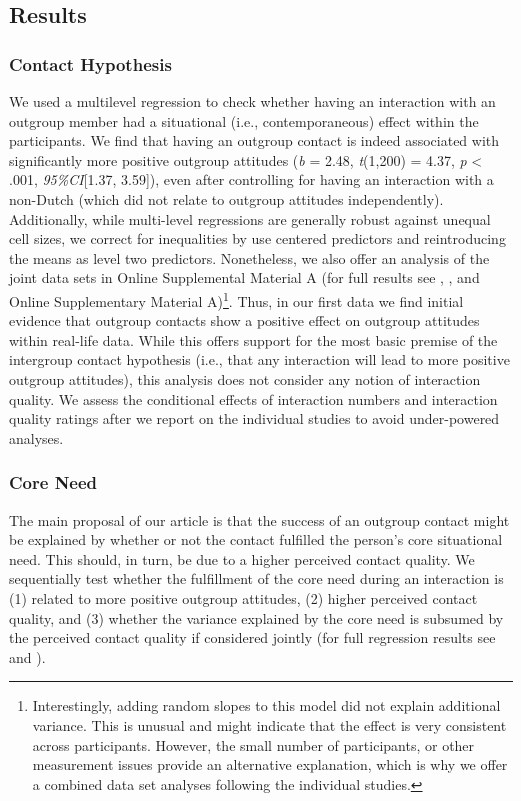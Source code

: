 \subsection{Results}

\subsubsection{Contact Hypothesis}

We used a multilevel regression to check whether having an interaction
with an outgroup member had a situational (i.e., contemporaneous) effect
within the participants. We find that having an outgroup contact is
indeed associated with significantly more positive outgroup attitudes
(\textit{b} = 2.48, \textit{t}(1,200) = 4.37, \textit{p} \textless{}
.001, \textit{95\%CI}{[}1.37, 3.59{]}), even after controlling for
having an interaction with a non-Dutch (which did not relate to outgroup
attitudes independently). Additionally, while multi-level regressions
are generally robust against unequal cell sizes, we correct for
inequalities by use centered predictors and reintroducing the means as
level two predictors. Nonetheless, we also offer an analysis of the
joint data sets in Online Supplemental Material A (for full results see
, ,
and Online Supplementary Material
A)\footnote{Interestingly, adding random slopes to this model did not explain additional variance. This is unusual and might indicate that the effect is very consistent across participants. However, the small number of participants, or other measurement issues provide an alternative explanation, which is why we offer a combined data set analyses following the individual studies.}.
Thus, in our first data we find initial evidence that outgroup contacts
show a positive effect on outgroup attitudes within real-life data.
While this offers support for the most basic premise of the intergroup
contact hypothesis (i.e., that any interaction will lead to more
positive outgroup attitudes), this analysis does not consider any notion
of interaction quality. We assess the conditional effects of interaction
numbers and interaction quality ratings after we report on the
individual studies to avoid under-powered analyses.

\subsubsection{Core Need}

The main proposal of our article is that the success of an outgroup
contact might be explained by whether or not the contact fulfilled the
person's core situational need. This should, in turn, be due to a higher
perceived contact quality. We sequentially test whether the fulfillment
of the core need during an interaction is (1) related to more positive
outgroup attitudes, (2) higher perceived contact quality, and (3)
whether the variance explained by the core need is subsumed by the
perceived contact quality if considered jointly (for full regression
results see  and
).

